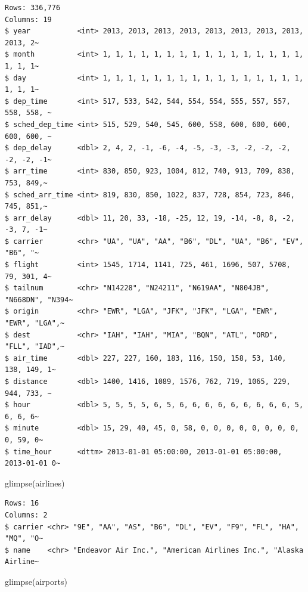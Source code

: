 \documentclass[
  letterpaper,
  DIV=11,
  numbers=noendperiod]{scrreprt}
\newenvironment{Shaded}{\begin{snugshade}}{\end{snugshade}}
\newcommand{\FunctionTok}[1]{\textcolor[rgb]{0.28,0.35,0.67}{#1}}
\newcommand{\NormalTok}[1]{\textcolor[rgb]{0.00,0.23,0.31}{#1}}
\begin{document}
\begin{verbatim}
Rows: 336,776
Columns: 19
$ year           <int> 2013, 2013, 2013, 2013, 2013, 2013, 2013, 2013, 2013, 2~
$ month          <int> 1, 1, 1, 1, 1, 1, 1, 1, 1, 1, 1, 1, 1, 1, 1, 1, 1, 1, 1~
$ day            <int> 1, 1, 1, 1, 1, 1, 1, 1, 1, 1, 1, 1, 1, 1, 1, 1, 1, 1, 1~
$ dep_time       <int> 517, 533, 542, 544, 554, 554, 555, 557, 557, 558, 558, ~
$ sched_dep_time <int> 515, 529, 540, 545, 600, 558, 600, 600, 600, 600, 600, ~
$ dep_delay      <dbl> 2, 4, 2, -1, -6, -4, -5, -3, -3, -2, -2, -2, -2, -2, -1~
$ arr_time       <int> 830, 850, 923, 1004, 812, 740, 913, 709, 838, 753, 849,~
$ sched_arr_time <int> 819, 830, 850, 1022, 837, 728, 854, 723, 846, 745, 851,~
$ arr_delay      <dbl> 11, 20, 33, -18, -25, 12, 19, -14, -8, 8, -2, -3, 7, -1~
$ carrier        <chr> "UA", "UA", "AA", "B6", "DL", "UA", "B6", "EV", "B6", "~
$ flight         <int> 1545, 1714, 1141, 725, 461, 1696, 507, 5708, 79, 301, 4~
$ tailnum        <chr> "N14228", "N24211", "N619AA", "N804JB", "N668DN", "N394~
$ origin         <chr> "EWR", "LGA", "JFK", "JFK", "LGA", "EWR", "EWR", "LGA",~
$ dest           <chr> "IAH", "IAH", "MIA", "BQN", "ATL", "ORD", "FLL", "IAD",~
$ air_time       <dbl> 227, 227, 160, 183, 116, 150, 158, 53, 140, 138, 149, 1~
$ distance       <dbl> 1400, 1416, 1089, 1576, 762, 719, 1065, 229, 944, 733, ~
$ hour           <dbl> 5, 5, 5, 5, 6, 5, 6, 6, 6, 6, 6, 6, 6, 6, 6, 5, 6, 6, 6~
$ minute         <dbl> 15, 29, 40, 45, 0, 58, 0, 0, 0, 0, 0, 0, 0, 0, 0, 59, 0~
$ time_hour      <dttm> 2013-01-01 05:00:00, 2013-01-01 05:00:00, 2013-01-01 0~
\end{verbatim}

\begin{Shaded}
\begin{Highlighting}[]
\FunctionTok{glimpse}\NormalTok{(airlines)}
\end{Highlighting}
\end{Shaded}

\begin{verbatim}
Rows: 16
Columns: 2
$ carrier <chr> "9E", "AA", "AS", "B6", "DL", "EV", "F9", "FL", "HA", "MQ", "O~
$ name    <chr> "Endeavor Air Inc.", "American Airlines Inc.", "Alaska Airline~
\end{verbatim}

\begin{Shaded}
\begin{Highlighting}[]
\FunctionTok{glimpse}\NormalTok{(airports)}
\end{Highlighting}
\end{Shaded}
\end{document}
